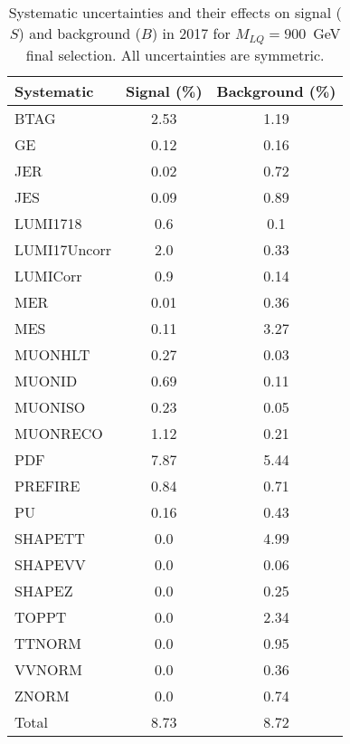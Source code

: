 \begin{table}[htbp]
\begin{center}
\caption{Systematic uncertainties and their effects on signal ($S$) and background ($B$) in 2017 for $M_{LQ}=900$~GeV final selection. All uncertainties are symmetric.}
\begin{tabular}{lcc}
\hline\hline
Systematic & Signal (\%) & Background (\%) \\ \hline 
BTAG & 2.53 & 1.19\\ 
GE & 0.12 & 0.16\\ 
JER & 0.02 & 0.72\\ 
JES & 0.09 & 0.89\\ 
LUMI1718 & 0.6 & 0.1\\ 
LUMI17Uncorr & 2.0 & 0.33\\ 
LUMICorr & 0.9 & 0.14\\ 
MER & 0.01 & 0.36\\ 
MES & 0.11 & 3.27\\ 
MUONHLT & 0.27 & 0.03\\ 
MUONID & 0.69 & 0.11\\ 
MUONISO & 0.23 & 0.05\\ 
MUONRECO & 1.12 & 0.21\\ 
PDF & 7.87 & 5.44\\ 
PREFIRE & 0.84 & 0.71\\ 
PU & 0.16 & 0.43\\ 
SHAPETT & 0.0 & 4.99\\ 
SHAPEVV & 0.0 & 0.06\\ 
SHAPEZ & 0.0 & 0.25\\ 
TOPPT & 0.0 & 2.34\\ 
TTNORM & 0.0 & 0.95\\ 
VVNORM & 0.0 & 0.36\\ 
ZNORM & 0.0 & 0.74\\ 
Total & 8.73 & 8.72\\ \hline \hline
\end{tabular}
\label{tab:SysUncertainties_uujj_900}
\end{center}
\end{table}

